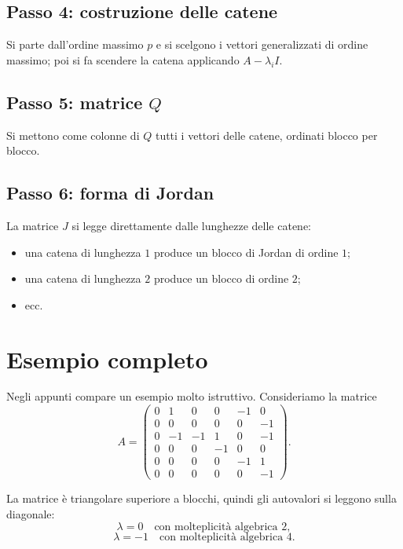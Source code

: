 \subsection*{Passo 4: costruzione delle catene}

Si parte dall'ordine massimo $p$ e si scelgono i vettori generalizzati di ordine massimo; poi si fa scendere la catena applicando $A-\lambda_i I$.

\subsection*{Passo 5: matrice \texorpdfstring{$Q$}{Q}}

Si mettono come colonne di $Q$ tutti i vettori delle catene, ordinati blocco per blocco.

\subsection*{Passo 6: forma di Jordan}

La matrice $J$ si legge direttamente dalle lunghezze delle catene:
\begin{itemize}
    \item una catena di lunghezza $1$ produce un blocco di Jordan di ordine $1$;
    \item una catena di lunghezza $2$ produce un blocco di ordine $2$;
    \item ecc.
\end{itemize}

\section{Esempio completo}

Negli appunti compare un esempio molto istruttivo. Consideriamo la matrice
\begin{equation}
A=
\begin{pmatrix}
0 & 1 & 0 & 0 & -1 & 0\\
0 & 0 & 0 & 0 & 0 & -1\\
0 & -1 & -1 & 1 & 0 & -1\\
0 & 0 & 0 & -1 & 0 & 0\\
0 & 0 & 0 & 0 & -1 & 1\\
0 & 0 & 0 & 0 & 0 & -1
\end{pmatrix}.
\label{eq:L7_example_A}
\end{equation}

La matrice è triangolare superiore a blocchi, quindi gli autovalori si leggono sulla diagonale:
\[
\lambda=0 \quad \text{con molteplicità algebrica }2,
\]
\[
\lambda=-1 \quad \text{con molteplicità algebrica }4.
\]

